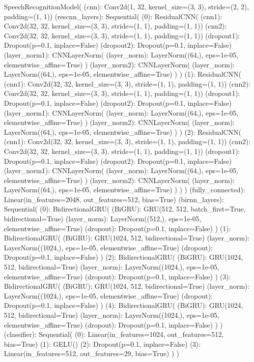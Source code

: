 {\small\begin{python}[scale=0.5]
SpeechRecognitionModel(
  (cnn): Conv2d(1, 32, kernel_size=(3, 3), stride=(2, 2), padding=(1, 1))
  (rescnn_layers): Sequential(
    (0): ResidualCNN(
      (cnn1): Conv2d(32, 32, kernel_size=(3, 3), stride=(1, 1), padding=(1, 1))
      (cnn2): Conv2d(32, 32, kernel_size=(3, 3), stride=(1, 1), padding=(1, 1))
      (dropout1): Dropout(p=0.1, inplace=False)
      (dropout2): Dropout(p=0.1, inplace=False)
      (layer_norm1): CNNLayerNorm(
        (layer_norm): LayerNorm((64,), eps=1e-05, elementwise_affine=True)
      )
      (layer_norm2): CNNLayerNorm(
        (layer_norm): LayerNorm((64,), eps=1e-05, elementwise_affine=True)
      )
    )
    (1): ResidualCNN(
      (cnn1): Conv2d(32, 32, kernel_size=(3, 3), stride=(1, 1), padding=(1, 1))
      (cnn2): Conv2d(32, 32, kernel_size=(3, 3), stride=(1, 1), padding=(1, 1))
      (dropout1): Dropout(p=0.1, inplace=False)
      (dropout2): Dropout(p=0.1, inplace=False)
      (layer_norm1): CNNLayerNorm(
        (layer_norm): LayerNorm((64,), eps=1e-05, elementwise_affine=True)
      )
      (layer_norm2): CNNLayerNorm(
        (layer_norm): LayerNorm((64,), eps=1e-05, elementwise_affine=True)
      )
    )
    (2): ResidualCNN(
      (cnn1): Conv2d(32, 32, kernel_size=(3, 3), stride=(1, 1), padding=(1, 1))
      (cnn2): Conv2d(32, 32, kernel_size=(3, 3), stride=(1, 1), padding=(1, 1))
      (dropout1): Dropout(p=0.1, inplace=False)
      (dropout2): Dropout(p=0.1, inplace=False)
      (layer_norm1): CNNLayerNorm(
        (layer_norm): LayerNorm((64,), eps=1e-05, elementwise_affine=True)
      )
      (layer_norm2): CNNLayerNorm(
        (layer_norm): LayerNorm((64,), eps=1e-05, elementwise_affine=True)
      )
    )
  )
  (fully_connected): Linear(in_features=2048, out_features=512, bias=True)
  (birnn_layers): Sequential(
    (0): BidirectionalGRU(
      (BiGRU): GRU(512, 512, batch_first=True, bidirectional=True)
      (layer_norm): LayerNorm((512,), eps=1e-05, elementwise_affine=True)
      (dropout): Dropout(p=0.1, inplace=False)
    )
    (1): BidirectionalGRU(
      (BiGRU): GRU(1024, 512, bidirectional=True)
      (layer_norm): LayerNorm((1024,), eps=1e-05, elementwise_affine=True)
      (dropout): Dropout(p=0.1, inplace=False)
    )
    (2): BidirectionalGRU(
      (BiGRU): GRU(1024, 512, bidirectional=True)
      (layer_norm): LayerNorm((1024,), eps=1e-05, elementwise_affine=True)
      (dropout): Dropout(p=0.1, inplace=False)
    )
    (3): BidirectionalGRU(
      (BiGRU): GRU(1024, 512, bidirectional=True)
      (layer_norm): LayerNorm((1024,), eps=1e-05, elementwise_affine=True)
      (dropout): Dropout(p=0.1, inplace=False)
    )
    (4): BidirectionalGRU(
      (BiGRU): GRU(1024, 512, bidirectional=True)
      (layer_norm): LayerNorm((1024,), eps=1e-05, elementwise_affine=True)
      (dropout): Dropout(p=0.1, inplace=False)
    )
  )
  (classifier): Sequential(
    (0): Linear(in_features=1024, out_features=512, bias=True)
    (1): GELU()
    (2): Dropout(p=0.1, inplace=False)
    (3): Linear(in_features=512, out_features=29, bias=True)
  )
)
\end{python}}